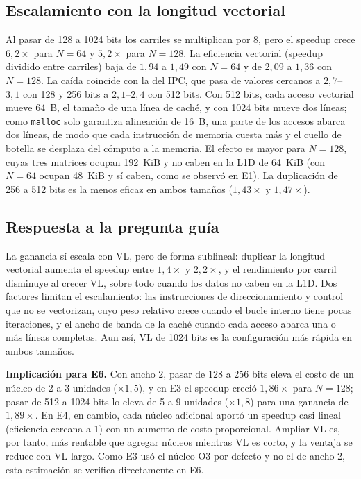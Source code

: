 \documentclass[journal]{IEEEtran}
\begin{document}
\subsection{Escalamiento con la longitud vectorial}

Al pasar de 128 a 1024 bits los carriles se multiplican por 8, pero el
speedup crece $6{,}2\times$ para $N=64$ y $5{,}2\times$ para $N=128$.
La eficiencia vectorial (speedup dividido entre carriles) baja de
$1{,}94$ a $1{,}49$ con $N=64$ y de $2{,}09$ a $1{,}36$ con $N=128$.
La caída coincide con la del IPC, que pasa de valores cercanos a
$2{,}7$--$3{,}1$ con 128 y 256 bits a $2{,}1$--$2{,}4$ con 512 bits.
Con 512 bits, cada acceso vectorial mueve \SI{64}{B}, el tamaño de una
línea de caché, y con 1024 bits mueve dos líneas; como \texttt{malloc} solo garantiza
alineación de \SI{16}{B}, una parte de los accesos abarca dos
líneas, de modo que cada instrucción de memoria cuesta más y el
cuello de botella se desplaza del cómputo a la memoria. El efecto es
mayor para $N=128$, cuyas tres matrices ocupan \SI{192}{KiB} y no caben
en la L1D de \SI{64}{KiB} (con $N=64$ ocupan \SI{48}{KiB} y sí caben,
como se observó en E1). La duplicación de 256 a 512 bits es la menos
eficaz en ambos tamaños ($1{,}43\times$ y $1{,}47\times$).

\subsection{Respuesta a la pregunta guía}

La ganancia sí escala con VL, pero de forma sublineal: duplicar la
longitud vectorial aumenta el speedup entre $1{,}4\times$ y $2{,}2\times$,
y el rendimiento por carril disminuye al crecer VL, sobre todo cuando
los datos no caben en la L1D. Dos factores limitan el escalamiento: las
instrucciones de direccionamiento y control que no se vectorizan, cuyo
peso relativo crece cuando el bucle interno tiene pocas iteraciones, y
el ancho de banda de la caché cuando cada acceso abarca una o más
líneas completas. Aun así, VL de 1024 bits es la configuración más
rápida en ambos tamaños.

\textbf{Implicación para E6.} Con ancho 2, pasar de 128 a 256 bits
eleva el costo de un núcleo de 2 a 3 unidades ($\times 1{,}5$), y en
E3 el speedup creció $1{,}86\times$ para $N=128$; pasar de 512 a 1024
bits lo eleva de 5 a 9 unidades ($\times 1{,}8$) para una ganancia de
$1{,}89\times$. En E4, en cambio, cada núcleo adicional aportó un
speedup casi lineal (eficiencia cercana a 1) con un aumento de costo
proporcional. Ampliar VL es, por tanto, más rentable que agregar
núcleos mientras VL es corto, y la ventaja se reduce con VL largo. Como
E3 usó el núcleo O3 por defecto y no el de ancho 2, esta estimación se
verifica directamente en E6.
\end{document}
